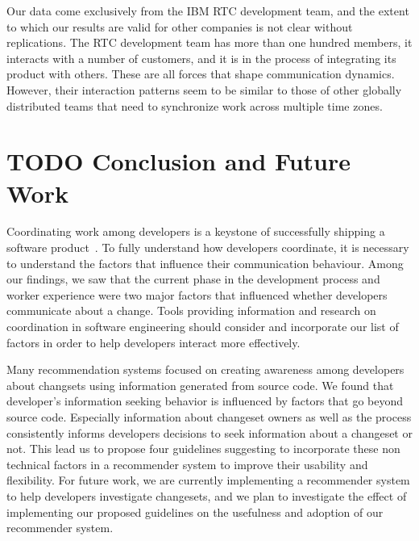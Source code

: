Our data come exclusively from the IBM RTC development team, and the extent to which our results are valid for other companies is not clear without replications. 
The RTC development team has more than one hundred members, it interacts with a number of customers, and it is in the process of integrating its product with others.
These are all forces that shape communication dynamics. 
However, their interaction patterns seem to be similar to those of other globally distributed teams that need to synchronize work across multiple time zones.

\section{TODO Conclusion and Future Work}
\label{sec:conclusions}
Coordinating work among developers is a keystone of successfully shipping a software product~\cite{herbsleb:icse:2001,kraut:1995coordination}. To fully understand how developers coordinate, it is necessary to understand the factors that influence their communication behaviour. Among our findings, we saw that the current phase in the development process and worker experience were two  major factors that influenced whether developers communicate about a change. Tools providing information and research on coordination in software engineering should consider and incorporate our list of factors in order to help developers interact more effectively.

Many recommendation systems focused on creating awareness among developers about changsets using information generated from source code. We found that developer's information seeking behavior is influenced by factors that go beyond source code. Especially information about changeset owners as well as the process consistently informs developers decisions to seek information about a changeset or not. This lead us to propose four guidelines suggesting to incorporate these non technical factors in a recommender system to improve their usability and flexibility.
For future work, we are currently implementing a recommender system to help developers investigate changesets, and we plan to investigate the effect of implementing our proposed guidelines on the usefulness and adoption of our recommender system.